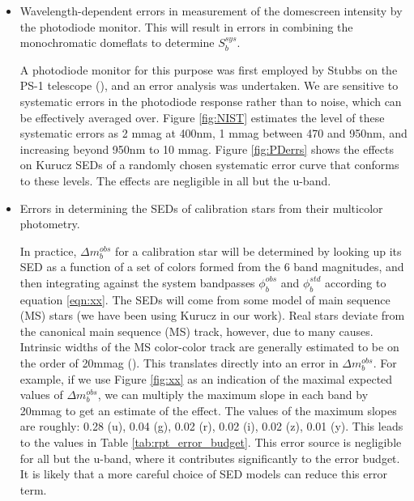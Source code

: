 \documentclass[12pt,preprint]{aastex}
\begin{document}
\begin{itemize}
\item{Wavelength-dependent errors in measurement of the domescreen intensity by the photodiode monitor.  This will result in errors in combining the monochromatic domeflats to determine $S_b^{sys}$.}

A photodiode monitor for this purpose was first employed by Stubbs on the PS-1 telescope (\citep{Stubbs2010a}), and an error analysis
was undertaken.  We are sensitive to systematic errors in the photodiode response rather than to noise, which can be effectively averaged over.  Figure \ref{fig:NIST} estimates the level of these systematic errors as 2 mmag at 400nm, 1 mmag between 470 and 950nm,
and increasing beyond 950nm to 10 mmag.  Figure \ref{fig:PDerrs} shows the effects on Kurucz SEDs of a randomly chosen systematic error curve that conforms to these levels.   The effects are negligible in all but the u-band.

\item{Errors in determining the SEDs of calibration stars from their multicolor photometry.}

In practice, $\Delta m_b^{obs}$ for a calibration star will be determined by looking up its SED as a function of a set of
colors formed from the 6 band magnitudes, and then integrating against the system bandpasses $\phi_b^{obs}$ and $\phi_b^{std}$
according to equation \ref{eqn:xx}.  The SEDs will come from some model of main sequence (MS) stars (we have been using Kurucz in 
our work).  Real stars deviate from the canonical main sequence (MS) track, however, due to many causes.  Intrinsic widths of the MS
color-color track are generally estimated to be on the order of 20mmag (\citep{Zeljko, Covey, High}). This translates directly into an error in $\Delta m_b^{obs}$.  For example, if we use Figure \ref{fig:xx} as an indication of the maximal expected values of 
$\Delta m_b^{obs}$, we can multiply the maximum slope in each band by 20mmag to get an estimate of the effect.  The values of
the maximum slopes are roughly:  0.28 (u), 0.04 (g), 0.02 (r), 0.02 (i), 0.02 (z), 0.01 (y).  This leads to the values
in Table \ref{tab:rpt_error_budget}.  This error source is negligible for all but the u-band, 
where it contributes significantly to the error budget.  It is likely that a more careful choice of SED models can reduce this
error term.

\end{itemize}
\end{document}
